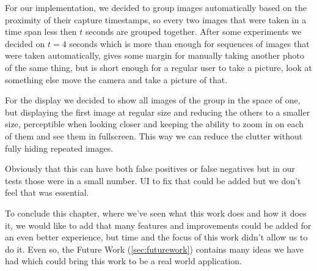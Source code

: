 For our implementation, we decided to group images automatically based on the proximity of their capture timestamps, so every two images that were taken in a time span less then $t$ seconds are grouped together. After some experiments we decided on $t=4$ seconds which is more than enough for sequences of images that were taken automatically, gives some margin for manually taking another photo of the same thing, but is short enough for a regular user to take a picture, look at something else move the camera and take a picture of that.

For the display we decided to show all images of the group in the space of one, but displaying the first image at regular size and reducing the others to a smaller size, perceptible when looking closer and keeping the ability to zoom in on each of them and see them in fullscreen. This way we can reduce the clutter without fully hiding repeated images. 

Obviously that this can have both false positives or false negatives but in our tests those were in a small number. \ac{UI} to fix that could be added but we don't feel that was essential.



To conclude this chapter, where we've seen what this work does and how it does it, we would like to add that many features and improvements could be added for an even better experience, but time and the focus of this work didn't allow us to do it. Even so, the Future Work (\ref{sec:futurework}) contains many ideas we have had which could bring this work to be a real world application.


